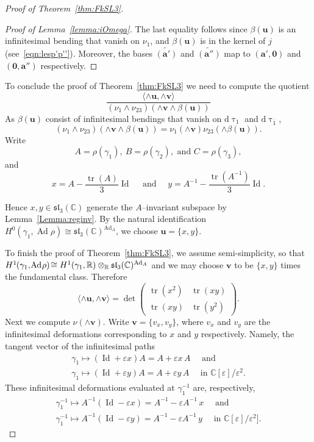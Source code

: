 \documentclass[11pt]{article}
\theoremstyle{definition}
\numberwithin{equation}{section}
\numberwithin{figure}{section}
\numberwithin{table}{section}
\DeclareMathOperator{\Ad}{Ad}
\DeclareMathOperator{\Id}{Id}
\DeclareMathOperator{\tr}{tr}
\newcommand*{\zero}{\mathbf{0}}
\newcommand{\Cbb}{\mathbb{C}}
\newcommand{\Rbb}{\mathbb {R}}
\newcommand{\slfrk}{\mathfrak{sl}}
\newcommand{\ubf}{\mathbf{u}}
\newcommand{\vbf}{\mathbf{v}}
\newcommand{\abf}{\mathbf{a}}
\newcommand*{\dd}{\mathrm{d}}
\newcommand*{\mk}{\mkern -1mu}
\newcommand*{\Mk}{\mkern -2mu}
\begin{document}
\begin{proof}[Proof of Theorem~\ref{thm:FkSL3}]
\begin{proof}[Proof of Lemma~\ref{lemma:iOmega}]
The last equality follows since $\beta({\ubf})$ is an infinitesimal bending that vanish on $\nu_1$, and $\beta({\ubf})$ is in the kernel of $j$ (see~\eqref{eqn:lesp'p''}). Moreover, the bases $\widetilde{(\abf')}$ and $\widetilde{(\abf'')}$ map to $(\abf',\zero)$ and $(\zero,\abf'')$ respectively.
\end{proof}


To conclude the proof of Theorem~\ref{thm:FkSL3} we need to compute the quotient
\[
\frac{ \langle \wedge\ubf, \wedge\vbf \rangle }{ (\nu_1 \wedge \nu_{23}) (\wedge\vbf\wedge\beta(\ubf)) }
\]
As $\beta({\ubf})$ consist of infinitesimal bendings that vanish on $\dd\uptau_1$ and $\dd\uptau_{\bar 1}$,
\[
{ (\nu_1 \wedge \nu_{23}) (\wedge\vbf\wedge\beta(\ubf)) }={\nu_1(\wedge\vbf)\nu_{23}(\wedge\beta(\ubf)) }.
\]
Write
\[
A=\rho(\gamma_1), \ B=\rho(\gamma_2), \text{ and } C=\rho(\gamma_3),
\]
and
\[
x=A-\frac{\tr(A) }{3}\Id\quad \text{ and }\quad y=A^{-1}-\frac{\tr(A^{-1}) }{3}\Id.
\]

Hence $x,y \in
\slfrk_3(\Cbb) $ generate the $A$--invariant subspace by Lemma~\ref{Lemma:reginv}. By the natural identification $H^0(\gamma_1,\Ad\rho)\cong
\slfrk_3(\Cbb)^{\Ad_A}$, we choose $\ubf=\{x,y\}$.



To finish the proof of Theorem~\ref{thm:FkSL3}, we assume semi-simplicity, so that $H^1\mk(\gamma_1,\Mk\Ad\Mk\rho)\!\cong H^1(\gamma_1,\Rbb)\otimes_\Rbb
\slfrk_3(\Cbb)^{\Ad_A}$ and we may choose $\vbf$ to be $\{x,y\}$ times the fundamental class. Therefore
\begin{equation}\label{eqn:wedgeuv}
\langle \wedge\ubf, \wedge\vbf \rangle=\det
\begin{pmatrix}
\tr(x^2) & \tr(x y) \\
\tr(x y) & \tr(y^2)
\end{pmatrix}.
\end{equation}
Next we compute $\nu(\wedge\vbf)$. Write $\vbf=\{v_x,v_y\}$, where $v_x$ and $v_y$ are the infinitesimal deformations corresponding to $x$ and $y$ respectively. Namely, the tangent vector of the infinitesimal paths
\begin{multline}\label{eqn:infvxvyg1}
\gamma_1\mapsto (\Id+\varepsilon x)A= A+\varepsilon x\,A \quad \text{ and }\\ \gamma_1\mapsto (\Id+\varepsilon y)A= A+\varepsilon y\, A \quad \text{ in }\Cbb[\varepsilon]/\varepsilon^2.
\end{multline}
These infinitesimal deformations evaluated at $\gamma_1^{-1}$ are, respectively,
\begin{multline}\label{eqn:infvxvyg1bar}
\gamma_1^{-1}\mapsto A^{-1}(\Id-\varepsilon x)= A^{-1}-\varepsilon A^{-1}\, x\quad \text{ and }\\
\gamma_1^{-1}\mapsto A^{-1}(\Id-\varepsilon y)= A^{-1}-\varepsilon A^{-1}\,y \quad
\text{ in }\Cbb[\varepsilon]/\varepsilon^2].
\end{multline}


\end{proof}
\end{document}
